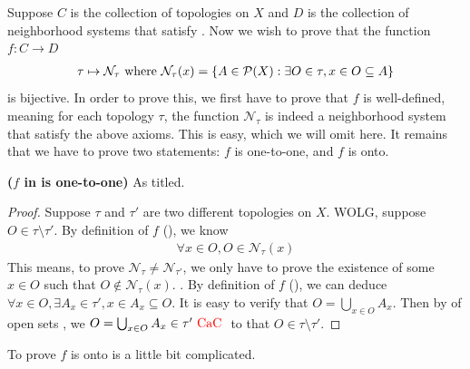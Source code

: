 \documentclass{report}
\begin{document}
\begin{mdframed}
Suppose $C$ is the collection of topologies on $X$ and $D$ is the collection of neighborhood systems that satisfy . Now we wish to prove that the function $f:C\rightarrow D$
\begin{align}
\label{1.2}
\tau \mapsto  \mathcal{N}_\tau\text{ where }\mathcal{N}_\tau (x)= \{ A \in \mathcal{P}(X): \exists O \in \tau, x \in O \subseteq A \}
\end{align}
is bijective. In order to prove this, we first have to prove that $f$ is well-defined, meaning for each topology $\tau$, the function $\mathcal{N}_\tau$ is indeed a neighborhood system that satisfy the above axioms. This is easy, which we will omit here. It remains that we have to prove two statements: $f$ is one-to-one, and  $f$ is onto.
\end{mdframed}
\begin{theorem}
\label{1.1.2}
\textbf{($f$ in  is one-to-one)} As titled. 
\end{theorem}
\begin{proof}
Suppose $\tau$ and $\tau'$ are two different topologies on $X$. WOLG, suppose $O \in \tau \setminus \tau'$. By definition of $f$ (), we know 
\begin{align*}
\forall x \in O, O \in \mathcal{N}_\tau (x)
\end{align*}
This means, to prove $\mathcal{N}_\tau \neq \mathcal{N}_{\tau'}$, we only have to prove the existence of some $x \in O$ such that $O \not\in \mathcal{N}_\tau (x)$. . By definition of $f$ (), we can deduce $\forall x \in O, \exists A_x \in \tau', x \in A_x \subseteq O$. It is easy to verify that $O= \bigcup_{x\in O} A_x$. Then by  of open sets , we $O=\bigcup_{x \in O}A_x \in \tau'\text{ \textcolor{red}{CaC} }$ to that $O \in \tau \setminus \tau'$. 
\end{proof}
\begin{mdframed}
To prove $f$ is onto is a little bit complicated. 
\end{mdframed}
\end{document}

